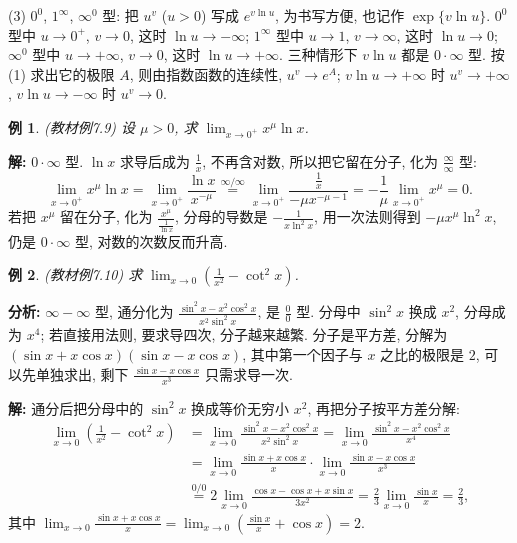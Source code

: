 \documentclass[UTF8,openany]{ctexbook}
\theoremstyle{chinesetextbook}
\newtheorem{example}{例}[section]
\newenvironment{cnsolution}{\par\indent\textbf{解:} \ignorespaces}{\par}
\begin{document}
(3) $0^0$, $1^\infty$, $\infty^0$ 型: 把 $u^v$ ($u>0$) 写成 $e^{v\ln u}$, 为书写方便, 也记作 $\exp\{v\ln u\}$. $0^0$ 型中 $u\to0^+$, $v\to0$, 这时 $\ln u\to-\infty$; $1^\infty$ 型中 $u\to1$, $v\to\infty$, 这时 $\ln u\to0$; $\infty^0$ 型中 $u\to+\infty$, $v\to0$, 这时 $\ln u\to+\infty$. 三种情形下 $v\ln u$ 都是 $0\cdot\infty$ 型. 按 (1) 求出它的极限 $A$, 则由指数函数的连续性, $u^v\to e^A$; $v\ln u\to+\infty$ 时 $u^v\to+\infty$, $v\ln u\to-\infty$ 时 $u^v\to0$.
\begin{example}\label{ex:c2-7-9}
\textnormal{(教材例7.9)} 设 $\mu>0$, 求 $\displaystyle\lim_{x\to0^+}x^\mu\ln x$.
\end{example}
\begin{cnsolution}
$0\cdot\infty$ 型. $\ln x$ 求导后成为 $\displaystyle\frac1x$, 不再含对数, 所以把它留在分子, 化为 $\displaystyle\frac\infty\infty$ 型:
\[
\lim_{x\to0^+}x^\mu\ln x=\lim_{x\to0^+}\frac{\ln x}{x^{-\mu}}\overset{\infty/\infty}{=}\lim_{x\to0^+}\frac{\frac1x}{-\mu x^{-\mu-1}}=-\frac1\mu\lim_{x\to0^+}x^\mu=0.
\]
若把 $x^\mu$ 留在分子, 化为 $\displaystyle\frac{x^\mu}{\frac1{\ln x}}$, 分母的导数是 $\displaystyle-\frac1{x\ln^2x}$, 用一次法则得到 $-\mu x^\mu\ln^2x$, 仍是 $0\cdot\infty$ 型, 对数的次数反而升高.
\end{cnsolution}
\begin{example}\label{ex:c2-7-10}
\textnormal{(教材例7.10)} 求 $\displaystyle\lim_{x\to0}\left(\frac1{x^2}-\cot^2x\right)$.
\end{example}
\par\indent\textbf{分析:} $\infty-\infty$ 型, 通分化为 $\displaystyle\frac{\sin^2x-x^2\cos^2x}{x^2\sin^2x}$, 是 $\displaystyle\frac00$ 型. 分母中 $\sin^2x$ 换成 $x^2$, 分母成为 $x^4$; 若直接用法则, 要求导四次, 分子越来越繁. 分子是平方差, 分解为 $(\sin x+x\cos x)(\sin x-x\cos x)$, 其中第一个因子与 $x$ 之比的极限是 $2$, 可以先单独求出, 剩下 $\displaystyle\frac{\sin x-x\cos x}{x^3}$ 只需求导一次.
\begin{cnsolution}
通分后把分母中的 $\sin^2x$ 换成等价无穷小 $x^2$, 再把分子按平方差分解:
\[
\begin{aligned}
\lim_{x\to0}\left(\frac1{x^2}-\cot^2x\right)&=\lim_{x\to0}\frac{\sin^2x-x^2\cos^2x}{x^2\sin^2x}=\lim_{x\to0}\frac{\sin^2x-x^2\cos^2x}{x^4}\\
&=\lim_{x\to0}\frac{\sin x+x\cos x}x\cdot\lim_{x\to0}\frac{\sin x-x\cos x}{x^3}\\
&\overset{0/0}{=}2\lim_{x\to0}\frac{\cos x-\cos x+x\sin x}{3x^2}=\frac23\lim_{x\to0}\frac{\sin x}x=\frac23,
\end{aligned}
\]
其中 $\displaystyle\lim_{x\to0}\frac{\sin x+x\cos x}x=\lim_{x\to0}\left(\frac{\sin x}x+\cos x\right)=2$.
\end{cnsolution}
\end{document}
